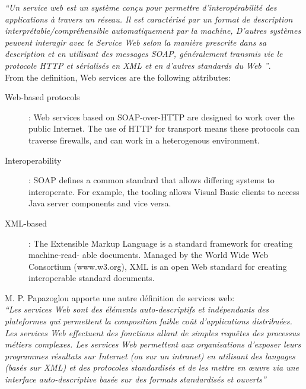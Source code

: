 	\emph{``Un service web est un système conçu pour permettre d'interopérabilité des applications à travers un réseau. 
	    Il est caractérisé par un format de description interprétable/compréhensible automatiquement par la machine,
	    D'autres systèmes peuvent interagir avec le Service Web selon la manière prescrite dans sa description et en
	    utilisant des messages SOAP, généralement transmis vie le protocole HTTP et sérialisés en XML et en d'autres 
	    standards du Web ''}.\\

	From the definition, Web services are the following attributes:

	\begin{description} %
	    \item[Web-based protocols] : 
		Web services based on SOAP-over-HTTP are designed to work over the public Internet. 
		The use of HTTP for transport means these protocols can traverse firewalls, and can work 
		in a heterogenous environment.

	    \item[Interoperability] : 
		SOAP defines a common standard that allows differing systems to interoperate. For example, the tooling 
		allows Visual Basic clients to access Java server components and vice versa.

	    \item[XML-based] : 
		The Extensible Markup Language is a standard framework for creating machine-read- able documents. 
		Managed by the World Wide Web Consortium (www.w3.org), XML is an open Web standard for creating 
		interoperable standard documents.
	\end{description}
	\newpage
	M. P. Papazoglou \cite{papazoglou2003service} apporte une autre définition de services web:\\

	\emph{``Les services Web sont des éléments auto-descriptifs et indépendants des plateformes qui permettent 
	    la composition faible coût d’applications distribuées. Les services Web effectuent des fonctions allant 
	    de simples requêtes des processus métiers complexes. Les services Web permettent aux organisations d’exposer 
	    leurs programmes résultats sur Internet (ou sur un intranet) en utilisant des langages (basés sur XML)
	    et des protocoles standardisés et de les mettre en œuvre via une interface auto-descriptive basée sur 
	    des formats standardisés et ouverts''}\\

